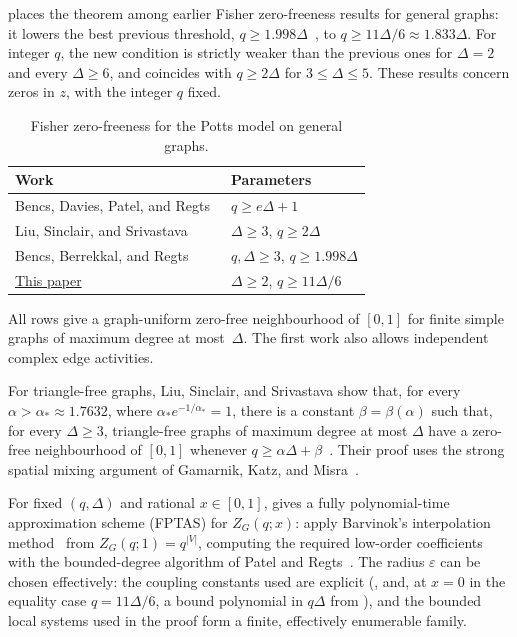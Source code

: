 \documentclass[11pt,reqno]{article}
\theoremstyle{plain}
\theoremstyle{definition}
\theoremstyle{remark}
\theoremstyle{definition}
\theoremstyle{remark}
\newcommand{\eps}{\varepsilon}
\newcommand{\Deg}{\Delta}                        %
\newcommand{\Zpart}{Z}                           %
\begin{document}
 places the theorem among earlier Fisher
zero-freeness results for general graphs: it lowers the best previous
threshold, \(q\ge1.998\Deg\)~\cite{BencsBerrekkalRegts2026}, to
\(q\ge11\Deg/6\approx1.833\Deg\).  For integer \(q\), the new condition
is strictly weaker than the previous ones for \(\Deg=2\) and every
\(\Deg\ge6\), and coincides with \(q\ge2\Deg\) for \(3\le\Deg\le5\).
These results concern zeros in \(z\), with the integer \(q\) fixed.

\begin{table}[H]
\centering
\small
\setlength{\tabcolsep}{6pt}
\renewcommand{\arraystretch}{1.15}
\begin{tabular}{@{}ll@{}}
\toprule
Work & Parameters \\
\midrule
Bencs, Davies, Patel, and Regts~\cite{BencsDaviesPatelRegts2021}
  & \(q\ge e\Deg+1\) \\
Liu, Sinclair, and Srivastava~\cite{LiuSinclairSrivastava2025}
  & \(\Deg\ge3\), \(q\ge2\Deg\) \\
Bencs, Berrekkal, and Regts~\cite{BencsBerrekkalRegts2026}
  & \(q,\Deg\ge3\), \(q\ge1.998\Deg\) \\
\midrule
\hyperref[thm:intro-main]{This paper}
  & \(\Deg\ge2\), \(q\ge11\Deg/6\) \\
\bottomrule
\end{tabular}
\smallskip

\parbox{0.97\textwidth}{\raggedright\footnotesize
All rows give a graph-uniform zero-free neighbourhood of \([0,1]\)
for finite simple graphs of maximum degree at most~\(\Deg\).
The first work also allows independent complex edge activities.}
\caption{Fisher zero-freeness for the Potts model on general graphs.}
\label{tab:intro-thresholds}
\end{table}

For triangle-free graphs, Liu, Sinclair, and Srivastava show that, for
every \(\alpha>\alpha_*\approx1.7632\), where \(\alpha_*e^{-1/\alpha_*}=1\),
there is a constant \(\beta=\beta(\alpha)\) such that, for every
\(\Deg\ge3\), triangle-free graphs of maximum degree at most \(\Deg\)
have a zero-free neighbourhood of \([0,1]\) whenever
\(q\ge\alpha\Deg+\beta\)~\cite[Theorem~1.3]{LiuSinclairSrivastava2025}.
Their proof uses the strong spatial mixing argument of Gamarnik, Katz,
and Misra~\cite{GamarnikKatzMisra2015}.

For fixed \((q,\Deg)\) and rational \(x\in[0,1]\),  gives
a fully polynomial-time approximation scheme (FPTAS) for
\(\Zpart_G(q;x)\): apply Barvinok's interpolation
method~\cite{Barvinok2016} from \(\Zpart_G(q;1)=q^{|V|}\), computing the
required low-order coefficients with the bounded-degree algorithm of
Patel and Regts~\cite{PatelRegts2017}.  The radius \(\eps\) can be
chosen effectively: the coupling constants used are explicit
(, and, at \(x=0\) in the
equality case \(q=11\Deg/6\), a bound polynomial in \(q\Deg\) from
\cite[Theorem~20]{CFFGZZ2024}), and the bounded local systems used in
the proof form a finite, effectively enumerable family.
\end{document}
